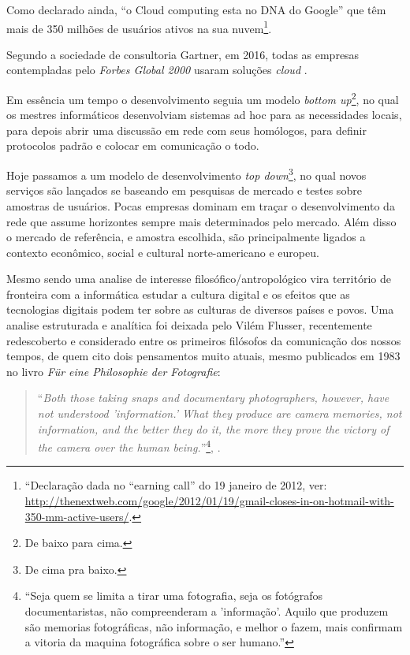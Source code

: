 Como declarado ainda, ``o Cloud computing esta no DNA do Google'' que
têm mais de 350 milhões de usuários ativos na sua
nuvem\footnote{``Declaração dada no ``earning call'' do 19 janeiro de
  2012, ver:
  \url{http://thenextweb.com/google/2012/01/19/gmail-closes-in-on-hotmail-with-350-mm-active-users/}.}.
 
Segundo a sociedade de consultoria Gartner, em 2016, todas as empresas
contempladas pelo \emph{Forbes Global 2000} usaram soluções
\emph{cloud} \citep{EY2011}.

Em essência um tempo o desenvolvimento seguia um modelo \emph{bottom
  up}\footnote{De baixo para cima.}, no qual os mestres informáticos
desenvolviam sistemas ad hoc para as necessidades locais, para depois
abrir uma discussão em rede com seus homólogos, para definir protocolos
padrão e colocar em comunicação o todo. 

Hoje passamos a um modelo de desenvolvimento \emph{top
  down}\footnote{De cima pra baixo.}, no qual novos serviços são
lançados se baseando em pesquisas de mercado e testes sobre amostras
de usuários. Pocas empresas dominam em traçar o desenvolvimento da
rede que assume horizontes sempre mais determinados pelo
mercado. Além disso o mercado de referência, e amostra escolhida, são
principalmente ligados a contexto econômico, social e cultural
norte-americano e europeu.   

Mesmo sendo uma analise de interesse filosófico/antropológico vira
território de fronteira com a informática estudar a cultura digital e
os efeitos que as tecnologias digitais podem ter sobre as culturas de
diversos países e povos. Uma analise estruturada e analítica foi
deixada pelo Vilém Flusser, recentemente redescoberto e considerado
entre os primeiros filósofos da comunicação dos nossos tempos, de quem
cito dois pensamentos muito atuais, mesmo publicados em 1983 no
livro \emph{F{\"u}r eine Philosophie der Fotografie}:

\begin{quote}
  ``\emph{Both those taking snaps and documentary photographers, however,
  have not understood 'information.' What they produce are camera
  memories, not information, and the better they do it, the more they
  prove the victory of the camera over the human
  being.}''\footnote{``Seja quem se limita a tirar uma fotografia,
  seja os fotógrafos documentaristas, não compreenderam a
  'informação'. Aquilo que produzem são memorias fotográficas, não
  informação, e melhor o fazem, mais confirmam a vitoria da maquina
  fotográfica sobre o ser humano.''}, \citet{flusser1983philosophie}.
\end{quote}


